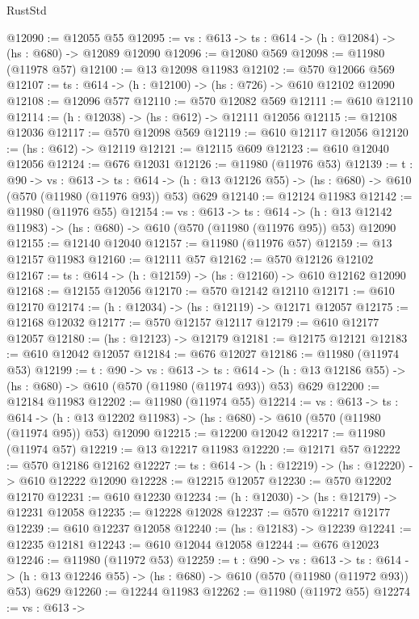 \begin{lexlean}{RustStd}
\begin{coremodule}
@12090 := @12055 @55
@12095 := {vs : @613} -> {ts : @614} -> (h : @12084) -> (hs : @680) -> @12089 @12090
@12096 := @12080 @569
@12098 := @11980 (@11978 @57)
@12100 := @13 @12098 @11983
@12102 := @570 @12066 @569
@12107 := {ts : @614} -> (h : @12100) -> (hs : @726) -> @610 @12102 @12090
@12108 := @12096 @577
@12110 := @570 @12082 @569
@12111 := @610 @12110
@12114 := (h : @12038) -> (hs : @612) -> @12111 @12056
@12115 := @12108 @12036
@12117 := @570 @12098 @569
@12119 := @610 @12117 @12056
@12120 := (hs : @612) -> @12119
@12121 := @12115 @609
@12123 := @610 @12040 @12056
@12124 := @676 @12031
@12126 := @11980 (@11976 @53)
@12139 := {t : @90} ->
  {vs : @613} ->
  {ts : @614} -> (h : @13 @12126 @55) -> (hs : @680) -> @610 (@570 (@11980 (@11976 @93)) @53) @629
@12140 := @12124 @11983
@12142 := @11980 (@11976 @55)
@12154 := {vs : @613} ->
  {ts : @614} ->
  (h : @13 @12142 @11983) -> (hs : @680) -> @610 (@570 (@11980 (@11976 @95)) @53) @12090
@12155 := @12140 @12040
@12157 := @11980 (@11976 @57)
@12159 := @13 @12157 @11983
@12160 := @12111 @57
@12162 := @570 @12126 @12102
@12167 := {ts : @614} -> (h : @12159) -> (hs : @12160) -> @610 @12162 @12090
@12168 := @12155 @12056
@12170 := @570 @12142 @12110
@12171 := @610 @12170
@12174 := (h : @12034) -> (hs : @12119) -> @12171 @12057
@12175 := @12168 @12032
@12177 := @570 @12157 @12117
@12179 := @610 @12177 @12057
@12180 := (hs : @12123) -> @12179
@12181 := @12175 @12121
@12183 := @610 @12042 @12057
@12184 := @676 @12027
@12186 := @11980 (@11974 @53)
@12199 := {t : @90} ->
  {vs : @613} ->
  {ts : @614} -> (h : @13 @12186 @55) -> (hs : @680) -> @610 (@570 (@11980 (@11974 @93)) @53) @629
@12200 := @12184 @11983
@12202 := @11980 (@11974 @55)
@12214 := {vs : @613} ->
  {ts : @614} ->
  (h : @13 @12202 @11983) -> (hs : @680) -> @610 (@570 (@11980 (@11974 @95)) @53) @12090
@12215 := @12200 @12042
@12217 := @11980 (@11974 @57)
@12219 := @13 @12217 @11983
@12220 := @12171 @57
@12222 := @570 @12186 @12162
@12227 := {ts : @614} -> (h : @12219) -> (hs : @12220) -> @610 @12222 @12090
@12228 := @12215 @12057
@12230 := @570 @12202 @12170
@12231 := @610 @12230
@12234 := (h : @12030) -> (hs : @12179) -> @12231 @12058
@12235 := @12228 @12028
@12237 := @570 @12217 @12177
@12239 := @610 @12237 @12058
@12240 := (hs : @12183) -> @12239
@12241 := @12235 @12181
@12243 := @610 @12044 @12058
@12244 := @676 @12023
@12246 := @11980 (@11972 @53)
@12259 := {t : @90} ->
  {vs : @613} ->
  {ts : @614} -> (h : @13 @12246 @55) -> (hs : @680) -> @610 (@570 (@11980 (@11972 @93)) @53) @629
@12260 := @12244 @11983
@12262 := @11980 (@11972 @55)
@12274 := {vs : @613} ->

\end{coremodule}
\end{lexlean}
